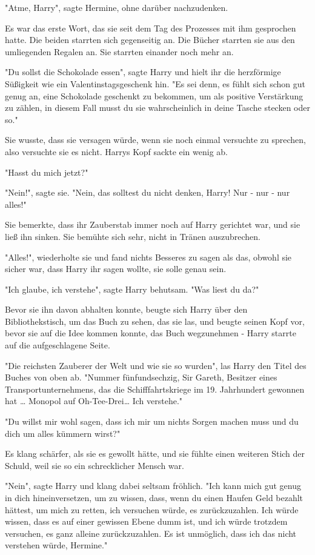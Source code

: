 {"Atme, Harry", sagte Hermine, ohne darüber nachzudenken.

Es war das erste Wort, das sie seit dem Tag des Prozesses mit ihm gesprochen hatte. Die beiden starrten sich gegenseitig an. Die Bücher starrten sie aus den umliegenden Regalen an. Sie starrten einander noch mehr an.

"Du sollst die Schokolade essen", sagte Harry und hielt ihr die herzförmige Süßigkeit wie ein Valentinstagsgeschenk hin. "Es sei denn, es fühlt sich schon gut genug an, eine Schokolade geschenkt zu bekommen, um als positive Verstärkung zu zählen, in diesem Fall musst du sie wahrscheinlich in deine Tasche stecken oder so."

Sie wusste, dass sie versagen würde, wenn sie noch einmal versuchte zu sprechen, also versuchte sie es nicht. Harrys Kopf sackte ein wenig ab.

"Hasst du mich jetzt?"

"Nein!", sagte sie. "Nein, das solltest du nicht denken, Harry! Nur - nur - nur alles!"

Sie bemerkte, dass ihr Zauberstab immer noch auf Harry gerichtet war, und sie ließ ihn sinken. Sie bemühte sich sehr, nicht in Tränen auszubrechen.

"Alles!", wiederholte sie und fand nichts Besseres zu sagen als das, obwohl sie sicher war, dass Harry ihr sagen wollte, sie solle genau sein.

"Ich glaube, ich verstehe", sagte Harry behutsam. "Was liest du da?"

Bevor sie ihn davon abhalten konnte, beugte sich Harry über den Bibliothekstisch, um das Buch zu sehen, das sie las, und beugte seinen Kopf vor, bevor sie auf die Idee kommen konnte, das Buch wegzunehmen - Harry starrte auf die aufgeschlagene Seite.

"Die reichsten Zauberer der Welt und wie sie so wurden", las Harry den Titel des Buches von oben ab. "Nummer fünfundsechzig, Sir Gareth, Besitzer eines Transportunternehmens, das die Schifffahrtskriege im 19. Jahrhundert gewonnen hat … Monopol auf Oh-Tee-Drei… Ich verstehe."

"Du willst mir wohl sagen, dass ich mir um nichts Sorgen machen muss und du dich um alles kümmern wirst?"

Es klang schärfer, als sie es gewollt hätte, und sie fühlte einen weiteren Stich der Schuld, weil sie so ein schrecklicher Mensch war.

"Nein", sagte Harry und klang dabei seltsam fröhlich. "Ich kann mich gut genug in dich hineinversetzen, um zu wissen, dass, wenn du einen Haufen Geld bezahlt hättest, um mich zu retten, ich versuchen würde, es zurückzuzahlen. Ich würde wissen, dass es auf einer gewissen Ebene dumm ist, und ich würde trotzdem versuchen, es ganz alleine zurückzuzahlen. Es ist unmöglich, dass ich das nicht verstehen würde, Hermine."

}
